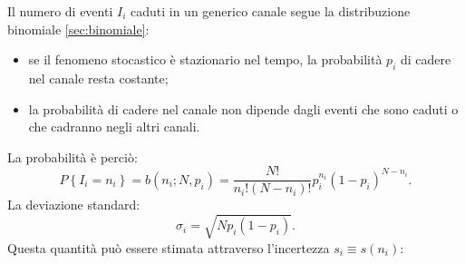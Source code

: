 Il numero di eventi $I_i$ caduti in un generico canale segue la distribuzione binomiale \ref{sec:binomiale}:
\begin{itemize}
\item se il fenomeno stocastico è stazionario nel tempo, la probabilità $p_i$ di cadere nel canale resta costante;
\item la probabilità di cadere nel canale non dipende dagli eventi che sono caduti o che cadranno negli altri canali.
\end{itemize}
La probabilità è perciò:
\begin{equation}
P\left\{ { I }_{ i }={ n }_{ i } \right\} =b\left( { n }_{ i };N,{ p }_{ i } \right) =\frac { N! }{ { n }_{ i }!\left( N-{ n }_{ i } \right) ! } { p }_{ i }^{ { n }_{ i } }{ \left( 1-{ p }_{ i } \right)  }^{ N-{ n }_{ i } }.
\end{equation}
La deviazione standard:
\begin{equation}
{ \sigma  }_{ i }=\sqrt { N{ p }_{ i }\left( 1-{ p }_{ i } \right)  } .
\end{equation}
Questa quantità può essere stimata attraverso l'incertezza $s_i \equiv s \left ( n_i \right)$:
